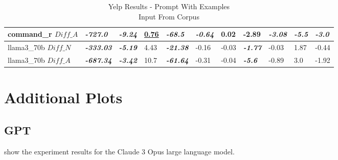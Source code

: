 \documentclass[11pt]{article}
\begin{document}
\begin{table}[!ht]
{\begin{tabular}{lllllllllll}
            command\_r $Diff\_A$  & \textbf{\textit{-727.0}}  & \textbf{\textit{-9.24}} & \textbf{\underline{0.76}} & \textbf{\textit{-68.5}}  & \textbf{\textit{-0.64}} & 0.02        & -2.89                   & \textbf{\textit{-3.08}} & \textbf{\textit{-5.5}}  & \textbf{\textit{-3.0}}  \\ \midrule
            llama3\_70b $Diff\_N$ & \textbf{\textit{-333.03}} & \textbf{\textit{-5.19}} & 4.43                      & \textbf{\textit{-21.38}} & -0.16                   & -0.03       & \textbf{\textit{-1.77}} & -0.03                   & 1.87                    & -0.44                   \\ \midrule
            llama3\_70b $Diff\_A$ & \textbf{\textit{-687.34}} & \textbf{\textit{-3.42}} & 10.7                      & \textbf{\textit{-61.64}} & -0.31                   & -0.04       & \textbf{\textit{-5.6}}  & -0.89                   & 3.0                     & -1.92                   \\ \bottomrule
        \end{tabular}%
    }
    \caption{Yelp Results - Prompt With Examples\\Input From Corpus}
    \label{table-prompt-2-ifd-yelp}
\end{table}

\section{Additional Plots}

\subsection{GPT}

show the experiment results for the Claude 3 Opus large language model.
\end{document}
